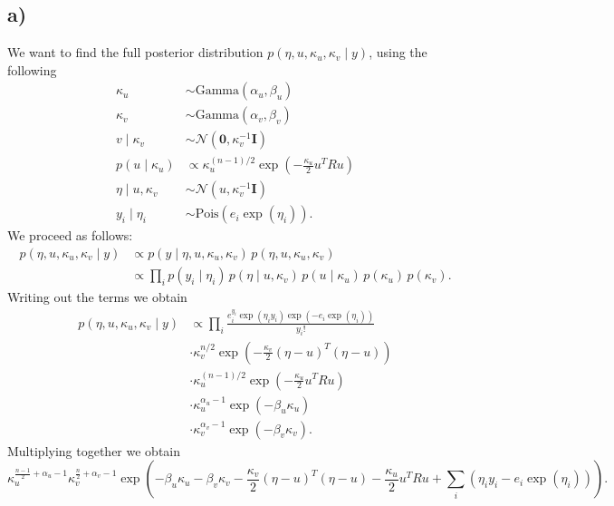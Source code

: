 \documentclass[a4paper]{article}\usepackage[]{graphicx}\usepackage[]{color}
\begin{document}
\subsection*{a)}
We want to find the full posterior distribution $p\left(\eta, u, \kappa_u, \kappa_v \mid y\right)$, using the following
\begin{align}
\kappa_u & \sim \mathrm{Gamma}(\alpha_u, \beta_u) \\
\kappa_v & \sim \mathrm{Gamma}(\alpha_v, \beta_v) \\
v \mid \kappa_v & \sim \mathcal{N}\left(\mathbf{0}, \kappa_v^{-1}\mathbf{I}\right) \\
p(u \mid \kappa_u) & \propto \kappa_u^{(n-1)/2} \exp\left(-\frac{\kappa_u}{2}u^TRu\right) \\
\eta \mid u, \kappa_v & \sim \mathcal{N}\left(u, \kappa_v^{-1}\mathbf{I}\right) \\
y_i \mid \eta_i & \sim \mathrm{Pois}\left(e_i \exp(\eta_i)\right).
\end{align}
We proceed as follows:
\begin{equation}
\begin{aligned}
p\left(\eta, u, \kappa_u, \kappa_v \mid y\right) & \propto p(y \mid \eta, u, \kappa_u, \kappa_v) \, p(\eta, u, \kappa_u, \kappa_v) \\
& \propto \prod_i p(y_i \mid \eta_i) \, p(\eta \mid u, \kappa_v) \, p(u \mid \kappa_u) \, p(\kappa_u) \, p(\kappa_v).
\end{aligned}
\end{equation}
Writing out the terms we obtain
\begin{equation}
\begin{aligned}
p\left(\eta, u, \kappa_u, \kappa_v \mid y\right)
& \propto \prod_i \frac{e_i^{y_i} \exp(\eta_i y_i) \exp\left(-e_i \exp(\eta_i)\right)}{y_i!} \\
& \cdot \kappa_v^{n/2} \exp\left(-\frac{\kappa_v}{2}\left(\eta - u\right)^T\left(\eta - u\right)\right) \\
& \cdot \kappa_u^{(n-1)/2} \exp\left(-\frac{\kappa_u}{2}u^TRu\right) \\
& \cdot \kappa_u^{\alpha_u - 1} \exp(-\beta_u \kappa_u) \\
& \cdot \kappa_v^{\alpha_v - 1} \exp(-\beta_v \kappa_v).
\end{aligned}
\end{equation}
Multiplying together we obtain
\begin{equation}
\kappa_u^{\frac{n-1}{2} + \alpha_u - 1} \kappa_v^{\frac{n}{2} + \alpha_v - 1}
\exp\left(-\beta_u\kappa_u - \beta_v\kappa_v 
- \frac{\kappa_v}{2}\left(\eta - u\right)^T\left(\eta - u\right)
- \frac{\kappa_u}{2}u^TRu
+ \sum_i \left( \eta_i y_i - e_i \exp(\eta_i)\right)
\right).
\label{eq:full_joint_posterior}
\end{equation}
\end{document}
